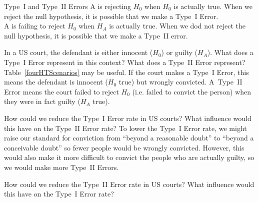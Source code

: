 \begin{onebox}{Type~I and Type~II Errors}
A  is rejecting $H_0$ when $H_0$ is actually true. When we reject the null hypothesis, it is possible that we make a Type~I Error. \\[2mm]
A  is failing to reject $H_0$ when $H_A$ is actually true. When we dod not reject the null hypothesis, it is possible that we make a Type~II error.\end{onebox}



\begin{examplewrap}
\begin{nexample}{In a US court, the defendant is either innocent ($H_0$) or guilty ($H_A$). What does a Type~I Error represent in this context? What does a Type~II Error represent? Table~\ref{fourHTScenarios} may be useful.}
If the court makes a Type~I Error, this means the defendant is innocent ($H_0$ true) but wrongly convicted. A~Type~II Error means the court failed to reject $H_0$ (i.e. failed to convict the person) when they were in fact guilty ($H_A$ true).
\end{nexample}
\end{examplewrap}

\begin{examplewrap}
\begin{nexample}{How could we reduce the Type~I Error rate in US courts? What influence would this have on the Type~II Error rate?}
To lower the Type~I Error rate, we might raise our standard for conviction from ``beyond a reasonable doubt'' to ``beyond a conceivable doubt'' so fewer people would be wrongly convicted. However, this would also make it more difficult to convict the people who are actually guilty, so we would make more Type~II Errors.
\end{nexample}
\end{examplewrap}

\begin{exercisewrap}
\begin{nexercise} \label{howToReduceType2ErrorsInUSCourts}
How could we reduce the Type~II Error rate in US courts? What influence would this have on the Type~I Error rate?\footnotemark
\end{nexercise}
\end{exercisewrap}

